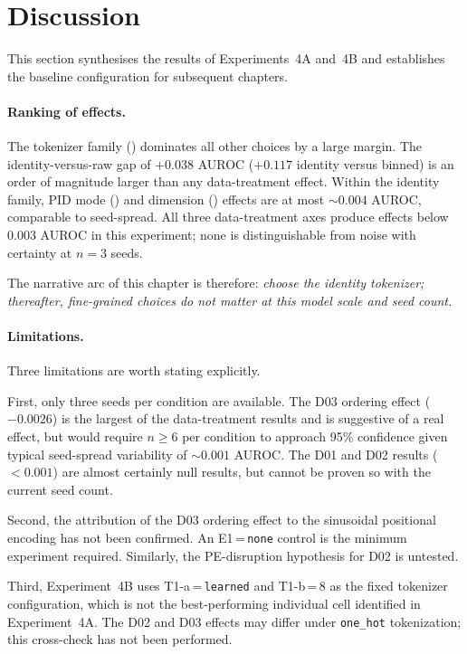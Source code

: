\section{Discussion}
\label{sec:ch4-discussion}

This section synthesises the results of Experiments~4A and~4B and establishes the baseline configuration for subsequent chapters.

\paragraph{Ranking of effects.}
The tokenizer family () dominates all other choices by a large margin.
The identity-versus-raw gap of $+0.038$ AUROC ($+0.117$ identity versus binned) is an order of magnitude larger than any data-treatment effect.
Within the identity family, PID mode () and dimension () effects are at most $\sim 0.004$ AUROC, comparable to seed-spread.
All three data-treatment axes produce effects below $0.003$ AUROC in this experiment; none is distinguishable from noise with certainty at $n=3$ seeds.

The narrative arc of this chapter is therefore: \emph{choose the identity tokenizer; thereafter, fine-grained choices do not matter at this model scale and seed count.}

\paragraph{Limitations.}
Three limitations are worth stating explicitly.

First, only three seeds per condition are available.
The D03 ordering effect ($-0.0026$) is the largest of the data-treatment results and is suggestive of a real effect, but would require $n \geq 6$ per condition to approach 95\% confidence given typical seed-spread variability of $\sim 0.001$ AUROC.
The D01 and D02 results ($<0.001$) are almost certainly null results, but cannot be proven so with the current seed count.

Second, the attribution of the D03 ordering effect to the sinusoidal positional encoding has not been confirmed.
An E1\,=\,\texttt{none} control is the minimum experiment required.
Similarly, the PE-disruption hypothesis for D02 is untested.

Third, Experiment~4B uses T1-a\,=\,\texttt{learned} and T1-b\,=\,8 as the fixed tokenizer configuration, which is not the best-performing individual cell identified in Experiment~4A.
The D02 and D03 effects may differ under \texttt{one\_hot} tokenization; this cross-check has not been performed.

